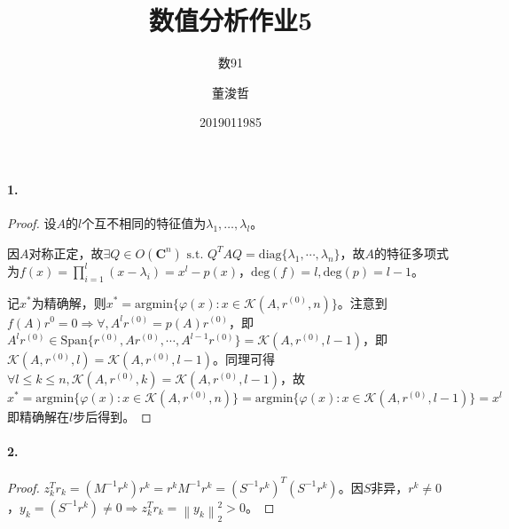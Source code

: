 \documentclass{ctexart}
\title{数值分析作业5}
\author{数91\and 董浚哲\and 2019011985}
\begin{document}
\maketitle
\newcommand{\R}{\mathbf{R}}
\newcommand{\dd}{\,\mathrm{d}}
\newcommand{\st}{\text{ s.t. }}
\newcommand{\pp}[2]{\frac{\partial #1}{\partial #2}}
\newcommand{\nm}[1]{\left\|#1\right\|}

\paragraph{1.}
\begin{proof}
设$A$的$l$个互不相同的特征值为$\lambda_1,\dots,\lambda_l$。

因$A$对称正定，故$\exists Q\in O(\mathbf{C}^n)\st Q^TAQ=\mathrm{diag}\{\lambda_1,\cdots,\lambda_n\}$，故$A$的特征多项式为$f(x)=\prod_{i=1}^l(x-\lambda_i)=x^l-p(x)$，$\mathrm{deg}(f)=l,\mathrm{deg}(p)=l-1$。

记$x^*$为精确解，则$x^*=\mathrm{argmin}\{\varphi(x):x\in \mathcal{K}(A,r^{(0)},n)\}$。注意到$f(A)r^0=0\Rightarrow \forall ,A^lr^{(0)}=p(A)r^{(0)}$，即$A^lr^{(0)}\in\mathrm{Span}\{r^{(0)},Ar^{(0)},\cdots, A^{l-1}r^{(0)}\}=\mathcal{K}(A,r^{(0)},l-1)$，即$\mathcal{K}(A,r^{(0)},l)=\mathcal{K}(A,r^{(0)},l-1)$。同理可得$\forall l\leq k\leq n, \mathcal{K}(A,r^{(0)},k)=\mathcal{K}(A,r^{(0)},l-1)$，故
\[x^*=\mathrm{argmin}\{\varphi(x):x\in \mathcal{K}(A,r^{(0)},n)\}=\mathrm{argmin}\{\varphi(x):x\in \mathcal{K}(A,r^{(0)},l-1)\}=x^l\]
即精确解在$l$步后得到。
\end{proof}

\paragraph{2.}
\begin{proof}
$z_k^Tr_k=(M^{-1}r^k)r^k=r^kM^{-1}r^k=(S^{-1}r^k)^T(S^{-1}r^k)$。因$S$非异，$r^k\neq 0$，$y_k=(S^{-1}r^k)\neq 0\Rightarrow z_k^Tr_k=\nm{y_k}^2_2>0$。
\end{proof}
\end{document}
